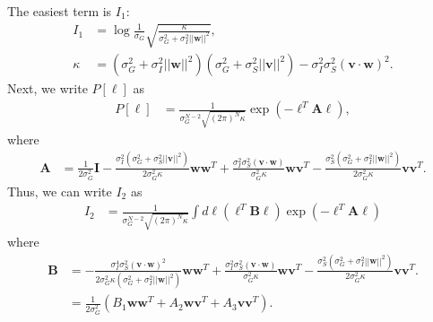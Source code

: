 \documentclass[11pt]{article}
\begin{document}
The easiest term is $I_1$:
\begin{align}
	I_1 &= \log \frac{1}{\sigma_G} \sqrt{\frac{\kappa}{\sigma_G^2 + \sigma_I^2 ||\mathbf{w}||^2}},\\
	\kappa &= (\sigma_G^2 + \sigma_I^2 ||\mathbf{w}||^2)(\sigma_G^2 + \sigma_S^2 ||\mathbf{v}||^2) - \sigma_I^2 \sigma_S^2 (\mathbf{v}\cdot\mathbf{w})^2.
\end{align}
Next, we write $P[\boldsymbol{\ell}]$ as 
\begin{align}
	P[\boldsymbol{\ell}] &= \frac{1}{\sigma_G^{N-2}\sqrt{(2\pi)^N \kappa}} \exp\left(- \boldsymbol{\ell}^T \mathbf{A} \boldsymbol{\ell}\right), 
\end{align}
where 
\begin{align}
	\mathbf{A} &= \frac{1}{2\sigma_G^2}\mathbf{I} - \frac{\sigma_I^2(\sigma_G^2 +\sigma_S^2 ||\mathbf{v}||^2)}{2\sigma_G^2 \kappa} \mathbf{ww}^T+ \frac{\sigma_I^2 \sigma_S^2 (\mathbf{v}\cdot \mathbf{w})}{\sigma_G^2 \kappa} \mathbf{wv}^T - \frac{\sigma_S^2 (\sigma_G^2 + \sigma_I^2 ||\mathbf{w}||^2)}{2\sigma_G^2 \kappa} \mathbf{vv}^T.
\end{align}
Thus, we can write $I_2$ as 
\begin{align}
	I_2 &= \frac{1}{\sigma_G^{N-2}\sqrt{(2\pi)^N \kappa}}\int d\boldsymbol{\ell} (\boldsymbol{\ell}^T \mathbf{B} \boldsymbol{\ell}) \exp(-\boldsymbol{\ell}^T \mathbf{A} \boldsymbol{\ell})
\end{align}
where 
\begin{align}
	\mathbf{B} &= - \frac{\sigma_I^4 \sigma_S^2 (\mathbf{v}\cdot \mathbf{w})^2}{2 \sigma_G^2 \kappa(\sigma_G^2 + \sigma_I^2 ||\mathbf{w}||^2)} \mathbf{ww}^T+ \frac{\sigma_I^2 \sigma_S^2 (\mathbf{v}\cdot \mathbf{w})}{\sigma_G^2 \kappa} \mathbf{wv}^T - \frac{\sigma_S^2(\sigma_G^2 + \sigma_I^2 ||\mathbf{w}||^2)}{2 \sigma_G^2 \kappa} \mathbf{vv}^T. \\
	&= \frac{1}{2\sigma_G^2} \left(B_1 \mathbf{ww}^T + A_2 \mathbf{wv}^T + A_3 \mathbf{vv}^T\right).
\end{align}
\end{document}
